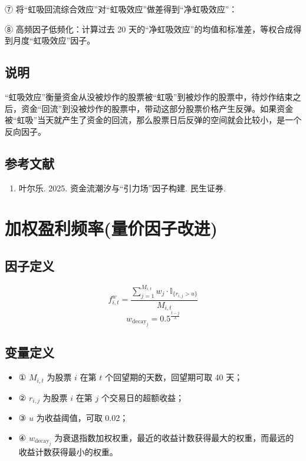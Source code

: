 \documentclass{article}
\begin{document}
⑦ 将“虹吸回流综合效应”对“虹吸效应”做差得到“净虹吸效应”：

⑧ 高频因子低频化：计算过去 20 天的“净虹吸效应”的均值和标准差，等权合成得到月度“虹吸效应”因子。

\subsection{说明}
“虹吸效应”衡量资金从没被炒作的股票被“虹吸”到被炒作的股票中，待炒作结束之后，资金“回流”到没被炒作的股票中，带动这部分股票价格产生反弹。如果资金被“虹吸”当天就产生了资金的回流，那么股票日后反弹的空间就会比较小，是一个反向因子。

\subsection{参考文献}
\begin{enumerate}
    \item 叶尔乐. 2025. 资金流潮汐与“引力场”因子构建. 民生证券.
\end{enumerate}

\section{加权盈利频率(量价因子改进)}

\subsection{因子定义}
\begin{equation}
    f_{i,t}^w = \frac{\sum_{j=1}^{M_{i,t}} w_j \cdot \mathbb{I}_{\{r_{i,j} > u\}}}{M_{i,t}}
\end{equation}
\begin{equation}
    w_{\mathrm{decay}_j} = 0.5^{\frac{t-j}{\lambda}}
\end{equation}

\subsection{变量定义}
\begin{itemize}
    \item ① \( M_{i,t} \) 为股票 \( i \) 在第 \( t \) 个回望期的天数，回望期可取 40 天；
    \item ② \( r_{i,j} \) 为股票 \( i \) 在第 \( j \) 个交易日的超额收益；
    \item ③ \( u \) 为收益阈值，可取 0.02；
    \item ④ \( w_{\mathrm{decay}_j} \) 为衰退指数加权权重，最近的收益计数获得最大的权重，而最远的收益计数获得最小的权重。
\end{itemize}
\end{document}

